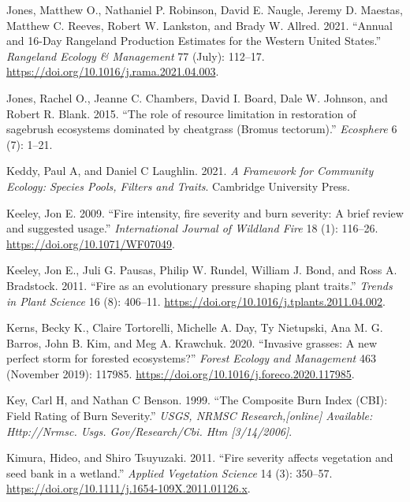 \documentclass[
  12pt,
]{article}
\newlength{\cslhangindent}
\newlength{\cslentryspacingunit} %
\newenvironment{CSLReferences}[2] %
 {%
  \setlength{\parindent}{0pt}
  \ifodd #1
  \let\oldpar\par
  \def\par{\hangindent=\cslhangindent\oldpar}
  \fi
  \setlength{\parskip}{#2\cslentryspacingunit}
 }%
 {}
\begin{document}
\begin{CSLReferences}{1}{0}
\leavevmode{}%
Jones, Matthew O., Nathaniel P. Robinson, David E. Naugle, Jeremy D.
Maestas, Matthew C. Reeves, Robert W. Lankston, and Brady W. Allred.
2021. {``Annual and 16-{Day} {Rangeland} {Production} {Estimates} for
the {Western} {United} {States}.''} \emph{Rangeland Ecology \&
Management} 77 (July): 112--17.
\url{https://doi.org/10.1016/j.rama.2021.04.003}.

\leavevmode{}%
Jones, Rachel O., Jeanne C. Chambers, David I. Board, Dale W. Johnson,
and Robert R. Blank. 2015. {``{The role of resource limitation in
restoration of sagebrush ecosystems dominated by cheatgrass (Bromus
tectorum)}.''} \emph{Ecosphere} 6 (7): 1--21.

\leavevmode{}%
Keddy, Paul A, and Daniel C Laughlin. 2021. \emph{A Framework for
Community Ecology: Species Pools, Filters and Traits}. Cambridge
University Press.

\leavevmode{}%
Keeley, Jon E. 2009. {``{Fire intensity, fire severity and burn
severity: A brief review and suggested usage}.''} \emph{International
Journal of Wildland Fire} 18 (1): 116--26.
\url{https://doi.org/10.1071/WF07049}.

\leavevmode{}%
Keeley, Jon E., Juli G. Pausas, Philip W. Rundel, William J. Bond, and
Ross A. Bradstock. 2011. {``{Fire as an evolutionary pressure shaping
plant traits}.''} \emph{Trends in Plant Science} 16 (8): 406--11.
\url{https://doi.org/10.1016/j.tplants.2011.04.002}.

\leavevmode{}%
Kerns, Becky K., Claire Tortorelli, Michelle A. Day, Ty Nietupski, Ana
M. G. Barros, John B. Kim, and Meg A. Krawchuk. 2020. {``{Invasive
grasses: A new perfect storm for forested ecosystems?}''} \emph{Forest
Ecology and Management} 463 (November 2019): 117985.
\url{https://doi.org/10.1016/j.foreco.2020.117985}.

\leavevmode{}%
Key, Carl H, and Nathan C Benson. 1999. {``The Composite Burn Index
(CBI): Field Rating of Burn Severity.''} \emph{USGS, NRMSC
Research,{[}online{]} Available: Http://Nrmsc. Usgs. Gov/Research/Cbi.
Htm {[}3/14/2006{]}}.

\leavevmode{}%
Kimura, Hideo, and Shiro Tsuyuzaki. 2011. {``{Fire severity affects
vegetation and seed bank in a wetland}.''} \emph{Applied Vegetation
Science} 14 (3): 350--57.
\url{https://doi.org/10.1111/j.1654-109X.2011.01126.x}.


\end{CSLReferences}
\end{document}
